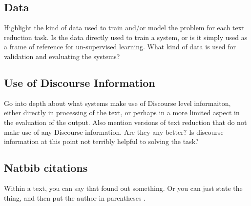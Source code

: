 \subsection{Data}

{Highlight the kind of data used to train and/or model the problem for each text reduction task. Is the data directly used to train a system, or is it simply used as a frame of reference for un-supervised learning.  What kind of data is used for validation and evaluating the systems? }

\subsection{Use of Discourse Information}
{Go into depth about what systems make use of Discourse level informaiton, either directly in processing of the text, or perhaps in a more limited aspect in the evaluation of the output.  Also mention versions of text reduction that do not make use of any Discourse information.  Are they any better?  Is discourse information at this point not terribly helpful to solving the task?}

\subsection{Natbib citations}
Within a text, you can say that \citet{lin2001} found out something. Or you can just state the thing, and then put the author in parentheses \citep[see][]{szpektor2004}.